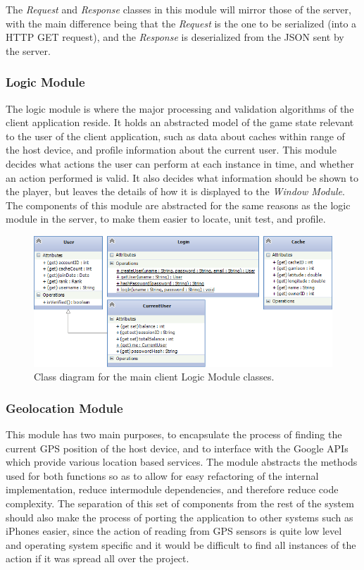 The \emph{Request} and \emph{Response} classes in this module will mirror those of the server, with the main difference being that the \emph{Request} is the one to be serialized (into a HTTP GET request), and the \emph{Response} is deserialized from the JSON sent by the server.

\subsubsection{Logic Module}
The logic module is where the major processing and validation algorithms of the client application reside. It holds an abstracted model of the game state relevant to the user of the client application, such as data about caches within range of the host device, and profile information about the current user. This module decides what actions the user can perform at each instance in time, and whether an action performed is valid. It also decides what information should be shown to the player, but leaves the details of how it is displayed to the \emph{Window Module}. The components of this module are abstracted for the same reasons as the logic module in the server, to make them easier to locate, unit test, and profile.

\begin{figure}[h!]
    \centering
    \includegraphics[width=\textwidth]{cllogiccd}
    \caption{Class diagram for the main client Logic Module classes.}
\end{figure}

\subsubsection{Geolocation Module}
This module has two main purposes, to encapsulate the process of finding the current GPS position of the host device, and to interface with the Google APIs which provide various location based services. The module abstracts the methods used for both functions so as to allow for easy refactoring of the internal implementation, reduce intermodule dependencies, and therefore reduce code complexity. The separation of this set of components from the rest of the system should also make the process of porting the application to other systems such as iPhones easier, since the action of reading from GPS sensors is quite low level and operating system specific and it would be difficult to find all instances of the action if it was spread all over the project.

